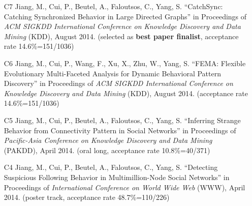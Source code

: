 \documentclass[10pt]{article}
\newenvironment{myindentpar}[1]%
{\begin{list}{}%
         {\setlength{\leftmargin}{#1}}%
         \item[]%
}
{\end{list}}
\newcounter{list}
\begin{document}
\begin{myindentpar}{0.00cm}
\begin{enumerate}[leftmargin=.5cm]
\vspace{-0.1cm}

\item[C7] Jiang, M., Cui, P., Beutel, A., Faloutsos, C., Yang, S. ``CatchSync: Catching Synchronized Behavior in Large Directed Graphs'' in Proceedings of \emph{ACM SIGKDD International Conference on Knowledge Discovery and Data Mining} (KDD), August 2014. (selected as \textbf{best paper finalist}, acceptance rate 14.6\%=151/1036)

\vspace{-0.1cm}

\item[C6] Jiang, M., Cui, P., Wang, F., Xu, X., Zhu, W., Yang, S. ``FEMA: Flexible Evolutionary Multi-Faceted Analysis for Dynamic Behavioral Pattern Discovery'' in Proceedings of \emph{ACM SIGKDD International Conference on Knowledge Discovery and Data Mining} (KDD), August 2014. (acceptance rate 14.6\%=151/1036)

\vspace{-0.1cm}

\item[C5] Jiang, M., Cui, P., Beutel, A., Faloutsos, C., Yang, S. ``Inferring Strange Behavior from Connectivity Pattern in Social Networks'' in Proceedings of \emph{Pacific-Asia Conference on Knowledge Discovery and Data Mining } (PAKDD), April 2014. (oral long, acceptance rate 10.8\%=40/371)

\vspace{-0.1cm}

\item[C4] Jiang, M., Cui, P., Beutel, A., Faloutsos, C., Yang, S. ``Detecting Suspicious Following Behavior in Multimillion-Node Social Networks'' in Proceedings of \emph{International Conference on World Wide Web} (WWW), April 2014. (poster track, acceptance rate 48.7\%=110/226)


\end{enumerate}
\end{myindentpar}
\end{document}

